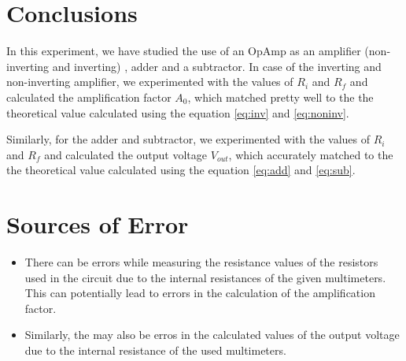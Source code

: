 \documentclass[12pt]{article}
\begin{document}
\section{Conclusions}
In this experiment, we have studied the use of an OpAmp as an amplifier (non-inverting and inverting) , adder and a subtractor. 
In case of the inverting and non-inverting amplifier, we experimented with the values of $R_i$ and $R_f$ and calculated the amplification factor $A_0$, which matched pretty well to the the theoretical value calculated using the equation \ref{eq:inv} and \ref{eq:noninv}.

\noindent
Similarly, for the adder and subtractor, we experimented with the values of $R_i$ and $R_f$ and calculated the output voltage $V_{out}$, which accurately matched to the the theoretical value calculated using the equation \ref{eq:add} and \ref{eq:sub}.



\section{Sources of Error}
\begin{itemize}
  \item There can be errors while measuring the resistance values of the resistors used in the circuit due to the internal resistances of the given multimeters. This can potentially lead to errors in the calculation of the amplification factor.
  \item Similarly, the may also be erros in the calculated values of the output voltage due to the internal resistance of the used multimeters.
\end{itemize}
\end{document}
